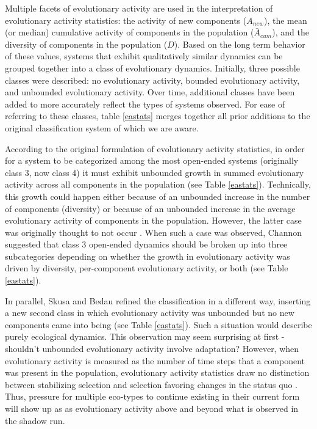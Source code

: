 \documentclass[letterpaper]{article}
\begin{document}
Multiple facets of evolutionary activity are used in the interpretation of evolutionary activity statistics: the activity of new components ($A_{new}$), the mean (or median) cumulative activity of components in the population ($\bar{A}_{cum}$), and the diversity of components in the population ($D$). Based on the long term behavior of these values, systems that exhibit qualitatively similar dynamics can be grouped together into a class of evolutionary dynamics. Initially, three possible classes were described: no evolutionary activity, bounded evolutionary activity, and unbounded evolutionary activity. Over time, additional classes have been added to more accurately reflect the types of systems observed. For ease of referring to these classes, table \ref{eastats} merges together all prior additions to the original classification system of which we are aware.



According to the original formulation of evolutionary activity statistics, in order for a system to be categorized among the most open-ended systems (originally class 3, now class 4) it must exhibit unbounded growth in summed evolutionary activity across all components in the population \citep{bedau_comparison_1997} (see Table \ref{eastats}). Technically, this growth could happen either because of an unbounded increase in the number of components (diversity) or because of an unbounded increase in the average evolutionary activity of components in the population. However, the latter case was originally thought to not occur \citep{bedau_classification_1998}. When such a case was observed, Channon suggested that class 3 open-ended dynamics should be broken up into three subcategories depending on whether the growth in evolutionary activity was driven by diversity, per-component evolutionary activity, or both \citep{channon_passing_2001} (see Table \ref{eastats}). 

In parallel, Skusa and Bedau refined the classification in a different way, inserting a new second class in which evolutionary activity was unbounded but no new components came into being \citep{skusa_towards_2003} (see Table \ref{eastats}). Such a situation would describe purely ecological dynamics. This observation may seem surprising at first - shouldn't unbounded evolutionary activity involve adaptation? However, when evolutionary activity is measured as the number of time steps that a component was present in the population, evolutionary activity statistics draw no distinction between stabilizing selection and selection favoring changes in the status quo \citep{channon_improving_2003}. Thus, pressure for multiple eco-types to continue existing in their current form will show up as as evolutionary activity above and beyond what is observed in the shadow run.  
\end{document}
